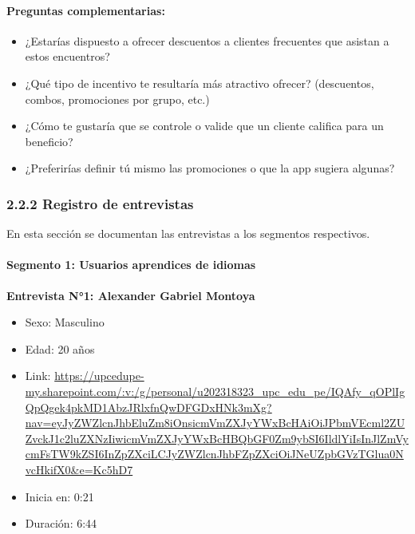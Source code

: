 \paragraph{Preguntas
complementarias:}\label{report__20-cap2-requirements-analysis.md__preguntas-complementarias-1}

\begin{itemize}
\tightlist
\item
  ¿Estarías dispuesto a ofrecer descuentos a clientes frecuentes que
  asistan a estos encuentros?
\item
  ¿Qué tipo de incentivo te resultaría más atractivo ofrecer?
  (descuentos, combos, promociones por grupo, etc.)
\item
  ¿Cómo te gustaría que se controle o valide que un cliente califica
  para un beneficio?
\item
  ¿Preferirías definir tú mismo las promociones o que la app sugiera
  algunas?
\end{itemize}

\subsubsection{2.2.2 Registro de
entrevistas}\label{report__20-cap2-requirements-analysis.md__registro-de-entrevistas}

En esta sección se documentan las entrevistas a los segmentos
respectivos.

\paragraph{Segmento 1: Usuarios aprendices de
idiomas}\label{report__20-cap2-requirements-analysis.md__segmento-1-usuarios-aprendices-de-idiomas}

\textbf{Entrevista N°1: Alexander Gabriel Montoya}

\begin{itemize}
\tightlist
\item
  Sexo: Masculino
\item
  Edad: 20 años
\item
  Link:
  \url{https://upcedupe-my.sharepoint.com/:v:/g/personal/u202318323_upc_edu_pe/IQAfy_qOPlIgQpQgek4pkMD1AbzJRlxfnQwDFGDxHNk3mXg?nav=eyJyZWZlcnJhbEluZm8iOnsicmVmZXJyYWxBcHAiOiJPbmVEcml2ZUZvckJ1c2luZXNzIiwicmVmZXJyYWxBcHBQbGF0Zm9ybSI6IldlYiIsInJlZmVycmFsTW9kZSI6InZpZXciLCJyZWZlcnJhbFZpZXciOiJNeUZpbGVzTGlua0NvcHkifX0&e=Kc5hD7}
\item
  Inicia en: 0:21
\item
  Duración: 6:44
\end{itemize}

